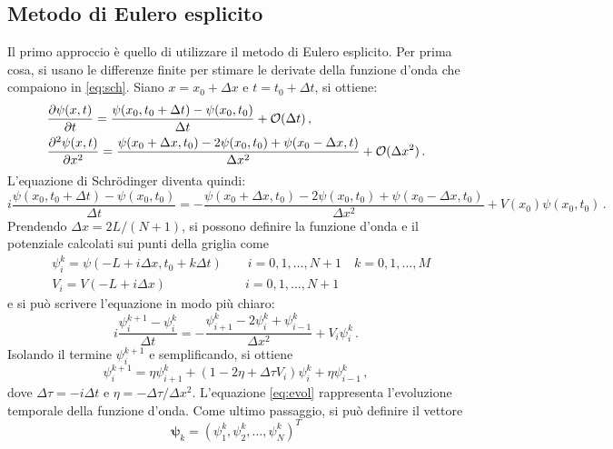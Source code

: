 \documentclass[a4paper, titlepage]{article}
\begin{document}
\subsection{Metodo di Eulero esplicito}
Il primo approccio è quello di utilizzare il metodo di Eulero esplicito. 
Per prima cosa, si usano le differenze finite per stimare le derivate della funzione d'onda che compaiono in \eqref{eq:sch}. Siano $x = x_0 + \Delta x$ e $t = t_0 + \Delta t$, si ottiene:
\begin{align*}
    &\pdv{\psi(x, t)}{t} = \frac{\psi(x_0, t_0 + \Delta t) - \psi(x_0, t_0)}{\Delta t} + \mathcal{O}(\Delta t)\, , \\
    &\pdv[2]{\psi(x, t)}{x} = \frac{\psi(x_0 + \Delta x, t_0) - 2\psi(x_0, t_0) + \psi(x_0 - \Delta x, t)}{\Delta x^2} + \mathcal{O}(\Delta x^2)\, .
\end{align*}
L'equazione di Schrödinger diventa quindi:
\begin{equation*}
    i \frac{\psi(x_0, t_0 + \Delta t) - \psi(x_0, t_0)}{\Delta t} = 
    - \frac{\psi(x_0 + \Delta x, t_0) - 2\psi(x_0, t_0) + \psi(x_0 - \Delta x, t_0)}{\Delta x^2} + V(x_0)\psi(x_0, t_0)\, .
\end{equation*}
Prendendo $\Delta x = 2L/(N+1)$, si possono definire la funzione d'onda e il potenziale calcolati sui punti della griglia come
\begin{align*}
    &\psi_i^k = \psi(-L + i\Delta x, t_0 + k\Delta t) \qquad i = 0,1,\dots,N+1 \quad k = 0,1,\dots,M \\
    &V_i = V(-L + i\Delta x) \qquad\qquad\qquad\ i = 0,1,\dots,N+1
\end{align*}
e si può scrivere l'equazione in modo più chiaro:
\begin{equation*}
    i \frac{\psi_i^{k+1} - \psi_i^k}{\Delta t} = 
    - \frac{\psi_{i+1}^k - 2\psi_i^k + \psi_{i-1}^k}{\Delta x^2} + V_i\psi_i^k\, .
\end{equation*}
Isolando il termine $\psi_i^{k+1}$ e semplificando, si ottiene
\begin{equation}
    \psi_i^{k+1} = \eta \psi_{i+1}^k + (1 - 2\eta + \Delta\tau V_i)\psi_i^k + \eta\psi_{i-1}^k\, ,
    \label{eq:evol}
\end{equation}
dove $\Delta\tau = -i\Delta t$ e $\eta = - \Delta\tau/\Delta x^2$. L'equazione \eqref{eq:evol} rappresenta l'evoluzione temporale della funzione d'onda. Come ultimo passaggio, si può definire il vettore
\begin{equation*}
    \bm{\psi}_k = (\psi_1^k,\psi_2^k,\dots,\psi_N^k)^T
\end{equation*}
\end{document}
